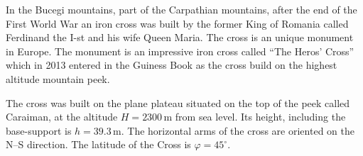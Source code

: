 
In the Bucegi mountains, part of the Carpathian mountains, after the end of
the First World War an iron cross was built by the former King of Romania
called Ferdinand the I-st and his wife Queen Maria. The cross is an unique
monument in Europe. The monument is an impressive iron cross called ``The
Heros' Cross'' which in 2013 entered in the Guiness Book as the cross build on
the highest altitude mountain peek.

The cross was built on the plane plateau situated on the top of the peek
called Caraiman, at the altitude $H = 2300$\,m from sea level. Its height,
including the base-support is $h = 39.3$\,m. The horizontal arms of the cross
are oriented on the N--S direction. The latitude of the Cross is
$\varphi = 45^\circ$.

